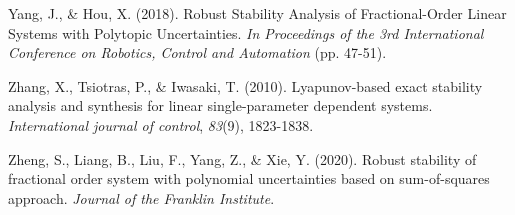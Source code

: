 \documentclass[]{interact}
\theoremstyle{plain}%
\theoremstyle{definition}
\theoremstyle{remark}
\begin{document}
\begin{thebibliography}{}
    Yang, J., \& Hou, X. (2018). Robust Stability Analysis of Fractional-Order Linear Systems with Polytopic Uncertainties. \emph{In Proceedings of the 3rd International Conference on Robotics, Control and Automation} (pp. 47-51).
    
   Zhang, X., Tsiotras, P., \& Iwasaki, T. (2010). Lyapunov-based exact stability analysis and synthesis for linear single-parameter dependent systems. \emph{International journal of control}, \emph{83}(9), 1823-1838.
   
   Zheng, S., Liang, B., Liu, F., Yang, Z., \& Xie, Y. (2020). Robust stability of fractional order system with polynomial uncertainties based on sum-of-squares approach. \emph{Journal of the Franklin Institute}.


\end{thebibliography}
\end{document}
